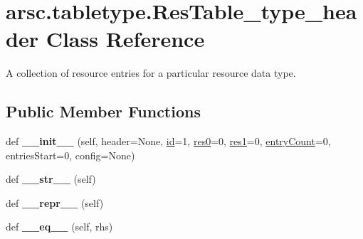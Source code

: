 \hypertarget{classarsc_1_1tabletype_1_1ResTable__type__header}{}\section{arsc.\+tabletype.\+Res\+Table\+\_\+type\+\_\+header Class Reference}
\label{classarsc_1_1tabletype_1_1ResTable__type__header}


A collection of resource entries for a particular resource data type.  


\subsection*{Public Member Functions}
\begin{DoxyCompactItemize}
\item 
\mbox{\label{classarsc_1_1tabletype_1_1ResTable__type__header_a2eb66b2503df1d61d438d00c0d89b430}} 
def {\bfseries \+\_\+\+\_\+init\+\_\+\+\_\+} (self, header=None, \mbox{\hyperlink{classarsc_1_1tabletype_1_1ResTable__type__header_abef8272ec94fa03d9c4e172581d65e40}{id}}=1, \mbox{\hyperlink{classarsc_1_1tabletype_1_1ResTable__type__header_a7f7636b7613e62a763247aa807bbeb6c}{res0}}=0, \mbox{\hyperlink{classarsc_1_1tabletype_1_1ResTable__type__header_ab67ee6048e79cef10c45b4d619f515d9}{res1}}=0, \mbox{\hyperlink{classarsc_1_1tabletype_1_1ResTable__type__header_aaf33c49ce80c953b5040683ba2f887ab}{entry\+Count}}=0, entries\+Start=0, config=None)
\item 
\mbox{\label{classarsc_1_1tabletype_1_1ResTable__type__header_ab0024701a5625cc5d5d9f3552117a6bc}} 
def {\bfseries \+\_\+\+\_\+str\+\_\+\+\_\+} (self)
\item 
\mbox{\label{classarsc_1_1tabletype_1_1ResTable__type__header_a5f496f92f7edd224ac2b302774a28e5d}} 
def {\bfseries \+\_\+\+\_\+repr\+\_\+\+\_\+} (self)
\item 
\mbox{\label{classarsc_1_1tabletype_1_1ResTable__type__header_a3460f750760b7633a37c52636610832a}} 
def {\bfseries \+\_\+\+\_\+eq\+\_\+\+\_\+} (self, rhs)
\item 

\end{DoxyCompactItemize}

